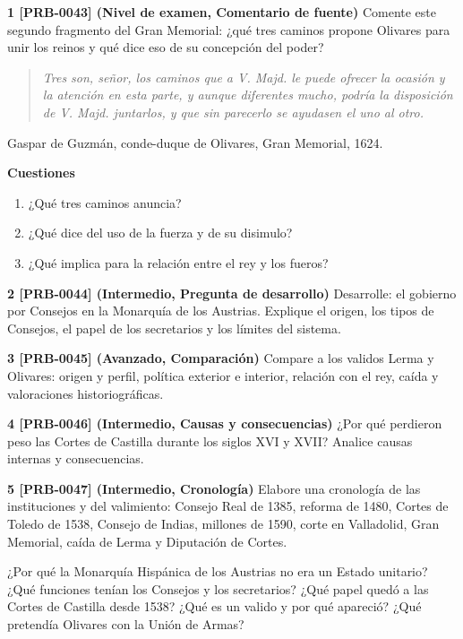 \documentclass{book}
\begin{document}
\begin{tcolorbox}[title={Ejercicios}, studiumworked, breakable]

\noindent\textbf{1 [PRB-0043] (Nivel de examen, Comentario de fuente)}
Comente este segundo fragmento del Gran Memorial: ¿qué tres caminos propone Olivares para unir los reinos y qué dice eso de su concepción del poder?


\begin{quote}
\itshape Tres son, señor, los caminos que a V. Majd. le puede ofrecer la ocasión y la atención en esta parte, y aunque diferentes mucho, podría la disposición de V. Majd. juntarlos, y que sin parecerlo se ayudasen el uno al otro.
\end{quote}
{\noindent\footnotesize Gaspar de Guzmán, conde-duque de Olivares, Gran Memorial, 1624.\par}

\noindent\textbf{Cuestiones}
\begin{enumerate}
\item ¿Qué tres caminos anuncia?
\item ¿Qué dice del uso de la fuerza y de su disimulo?
\item ¿Qué implica para la relación entre el rey y los fueros?
\end{enumerate}

\noindent\textbf{2 [PRB-0044] (Intermedio, Pregunta de desarrollo)}
Desarrolle: el gobierno por Consejos en la Monarquía de los Austrias. Explique el origen, los tipos de Consejos, el papel de los secretarios y los límites del sistema.


\noindent\textbf{3 [PRB-0045] (Avanzado, Comparación)}
Compare a los validos Lerma y Olivares: origen y perfil, política exterior e interior, relación con el rey, caída y valoraciones historiográficas.


\noindent\textbf{4 [PRB-0046] (Intermedio, Causas y consecuencias)}
¿Por qué perdieron peso las Cortes de Castilla durante los siglos XVI y XVII? Analice causas internas y consecuencias.


\noindent\textbf{5 [PRB-0047] (Intermedio, Cronología)}
Elabore una cronología de las instituciones y del valimiento: Consejo Real de 1385, reforma de 1480, Cortes de Toledo de 1538, Consejo de Indias, millones de 1590, corte en Valladolid, Gran Memorial, caída de Lerma y Diputación de Cortes.

\end{tcolorbox}

\begin{tcolorbox}[title={Autoficha}, studiumcheck, breakable]

¿Por qué la Monarquía Hispánica de los Austrias no era un Estado unitario? ¿Qué funciones tenían los Consejos y los secretarios? ¿Qué papel quedó a las Cortes de Castilla desde 1538? ¿Qué es un valido y por qué apareció? ¿Qué pretendía Olivares con la Unión de Armas?

\end{tcolorbox}
\end{document}
